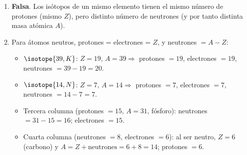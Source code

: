 \begin{exerciseEVAU}
    \begin{solu}
        \begin{enumerate}[label=\letraminuscula]
            \item \textbf{Falsa}. Los isótopos de un mismo elemento tienen el mismo número de protones (mismo \(Z\)), pero distinto número de neutrones (y por tanto distinta masa atómica \(A\)).
            \item Para átomos neutros, protones = electrones = \(Z\), y neutrones \(= A - Z\):
            \begin{itemize}
                \item \(\isotope{39,K}\): \(Z=19\), \(A=39 \Rightarrow\) protones \(=19\), electrones \(=19\), neutrones \(=39-19=20\).
                \item \(\isotope{14,N}\): \(Z=7\), \(A=14 \Rightarrow\) protones \(=7\), electrones \(=7\), neutrones \(=14-7=7\).
                \item Tercera columna (protones \(=15\), \(A=31\), fósforo): neutrones \(=31-15=16\); electrones \(=15\).
                \item Cuarta columna (neutrones \(=8\), electrones \(=6\)): al ser neutro, \(Z=6\) (carbono) y \(A=Z+\text{neutrones}=6+8=14\); protones \(=6\).
            \end{itemize}
        \end{enumerate}
    \end{solu}
\end{exerciseEVAU}

